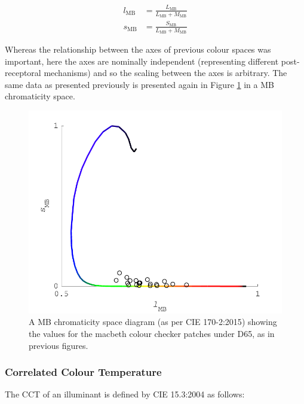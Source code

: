 \begin{subequations}
\begin{align}
l_{\text{MB}}&= \frac{L_{\text{MB}}}{L_{\text{MB}}+M_{\text{MB}}} \\ 
s_{\text{MB}}&= \frac{S_{\text{MB}}}{L_{\text{MB}}+M_{\text{MB}}} 
\end{align}
\label{eq:MB}
\end{subequations}

Whereas the relationship between the axes of previous colour spaces was important, here the axes are nominally independent (representing different post-receptoral mechanisms) and so the scaling between the axes is arbitrary. The same data as presented previously is presented again in Figure \ref{fig:lrMB} in a \gls{MB} chromaticity space.

\begin{figure}[htbp]
\includegraphics[max width=\textwidth]{figs/LitRev/ColorimetryDemo5.pdf}
\caption{A \gls{MB} chromaticity space diagram (as per \gls{CIE} 170-2:2015\citep{cie_cie_2015}) showing the values for the macbeth colour checker patches under D65, as in previous figures.}
\label{fig:lrMB}
\end{figure}

\subsubsection{Correlated Colour Temperature}

The \acrfull{CCT} of an illuminant is defined by CIE 15.3:2004 \citep{cie_cie_2004-2} as follows:

